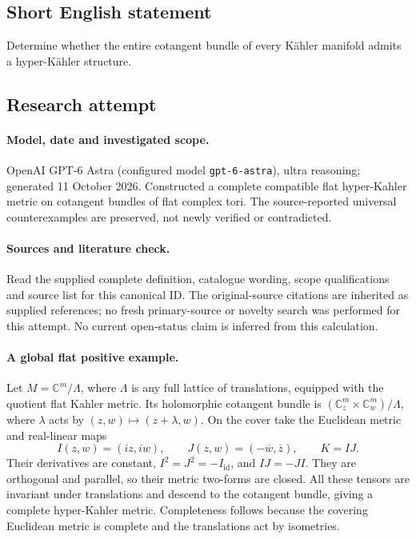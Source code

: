 \documentclass[11pt]{article}
\begin{document}
\subsection{Short English statement}
Determine whether the entire cotangent bundle of every Kähler manifold admits a hyper-Kähler structure.
\subsection{Research attempt}
\paragraph{Model, date and investigated scope.}
OpenAI GPT-6 Astra (configured model \texttt{gpt-6-astra}), ultra reasoning; generated 11 October 2026. Constructed a complete compatible flat hyper-Kahler metric on cotangent bundles of flat complex tori. The source-reported universal counterexamples are preserved, not newly verified or contradicted.

\paragraph{Sources and literature check.}
Read the supplied complete definition, catalogue wording, scope qualifications and source list for this canonical ID. The original-source citations are inherited as supplied references; no fresh primary-source or novelty search was performed for this attempt. No current open-status claim is inferred from this calculation.

\paragraph{A global flat positive example.}Let \(M=\mathbb C^m/\Lambda\), where \(\Lambda\) is any full lattice of translations, equipped with the quotient flat Kahler metric. Its holomorphic cotangent bundle is \((\mathbb C^m_z\times\mathbb C^m_w)/\Lambda\), where \(\lambda\) acts by \((z,w)\mapsto(z+\lambda,w)\). On the cover take the Euclidean metric and real-linear maps
\[I(z,w)=(iz,iw),\qquad J(z,w)=(-\overline w,\overline z),\qquad K=IJ.
\]
Their derivatives are constant, \(I^2=J^2=-I_{\mathrm{id}}\), and \(IJ=-JI\). They are orthogonal and parallel, so their metric two-forms are closed. All these tensors are invariant under translations and descend to the cotangent bundle, giving a complete hyper-Kahler metric. Completeness follows because the covering Euclidean metric is complete and the translations act by isometries.
\end{document}
